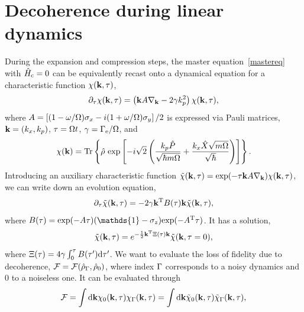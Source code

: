 \documentclass[reprint,prx,footinbib,floatfix,twocolumn,longbibliography,superscriptaddress]{revtex4-2}
\begin{document}
\section{Decoherence during linear dynamics}
\label{appB}
During the expansion and compression steps, the master equation~\eqref{mastereq} with $\hat{H}_\text{c} = 0$ can be equivalently recast onto a dynamical equation for a characteristic function $\chi (\mathbf{k},\tau)$,
\begin{equation}
    \partial_{\tau} \chi (\mathbf{k},\tau) = \left( \mathbf{k} A \nabla_{\mathbf{k}}-2\gamma k_{p}^2 \right) \chi (\mathbf{k},\tau),
\end{equation}
where $A = \left[ (1- \omega / \Omega) \sigma_x - i (1+\omega / \Omega) \sigma_y \right]/2$ is expressed via Pauli matrices, $\mathbf{k} = (k_{x} , k_{p})$, $\tau = \Omega t$, $\gamma = \Gamma_{\text{e}} / \Omega$, and
\begin{equation}
     \chi (\mathbf{k})  = \text{Tr} \left\{ \hat{\rho} \ \text{exp} \left[-i \sqrt{2} \left( \frac{k_{p} \hat{P}}{\sqrt{\hbar m \Omega}} + \frac{k_{x} \hat{X} \sqrt{m \Omega}}{\sqrt{\hbar}}\right) \right]\right\}.
\end{equation}
Introducing an auxiliary characteristic function $\tilde{\chi} (\mathbf{k},\tau) = \text{exp}(-\tau\mathbf{k} A \nabla_{\mathbf{k}}) \chi (\mathbf{k},\tau)$, we can write down an evolution equation,
\begin{equation}
    \partial_{\tau} \tilde{\chi} (\mathbf{k},\tau) = -2\gamma \mathbf{k}^{\text{T}} B(\tau) \mathbf{k}\tilde{\chi} (\mathbf{k},\tau),
\end{equation}
where $\MatrixNoiseAux(\Time) = \text{exp} (-\MatrixEvo \Time) (\mathds{1} - \PauliZ) \text{exp} (-\MatrixEvo^{\text{T}} \Time)$.
It has a solution,
\begin{equation}
     \tilde{\chi} (\mathbf{k},\tau) = e^{-\frac{1}{2} \mathbf{k}^{\text{T}} \Xi (\tau) \mathbf{k}} \tilde{\chi} (\mathbf{k},\tau=0),
\end{equation}
where $\Xi (\tau) = 4 \gamma \int_0^\tau B(\tau') \dd \tau'$.
We want to evaluate the loss of fidelity due to decoherence, $\mathcal{F} = \mathcal{F}(\hat{\rho}_\Gamma,\hat{\rho}_0)$, where index $\Gamma$ corresponds to a noisy dynamics and $0$ to a noiseless one.
It can be evaluated through 
\begin{equation}
     \mathcal{F} = \int \dd \mathbf{k} \chi_0(\mathbf{k},\tau) \chi_\Gamma(\mathbf{k},\tau) = \int \dd \mathbf{k} \tilde{\chi}_0(\mathbf{k},\tau) \tilde{\chi}_\Gamma(\mathbf{k},\tau),
\end{equation}
\end{document}
